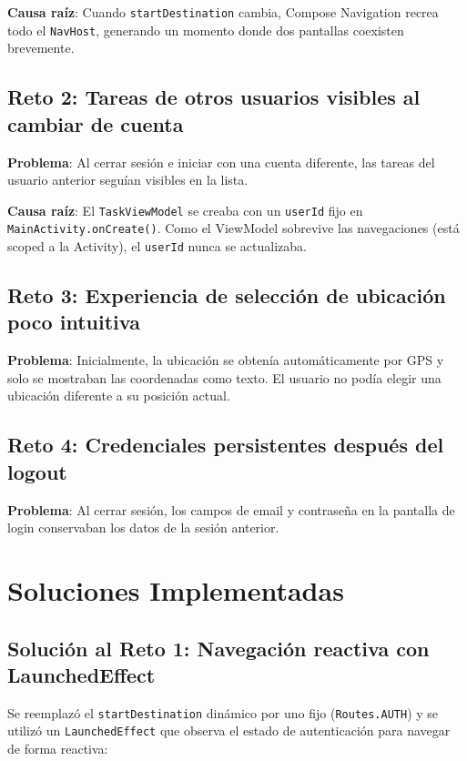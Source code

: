 \documentclass[12pt,a4paper]{article}
\begin{document}
\textbf{Causa raíz}: Cuando \texttt{startDestination} cambia, Compose Navigation recrea todo el \texttt{NavHost}, generando un momento donde dos pantallas coexisten brevemente.

\subsection{Reto 2: Tareas de otros usuarios visibles al cambiar de cuenta}

\textbf{Problema}: Al cerrar sesión e iniciar con una cuenta diferente, las tareas del usuario anterior seguían visibles en la lista.

\textbf{Causa raíz}: El \texttt{TaskViewModel} se creaba con un \texttt{userId} fijo en \texttt{MainActivity.onCreate()}. Como el ViewModel sobrevive las navegaciones (está scoped a la Activity), el \texttt{userId} nunca se actualizaba.

\subsection{Reto 3: Experiencia de selección de ubicación poco intuitiva}

\textbf{Problema}: Inicialmente, la ubicación se obtenía automáticamente por GPS y solo se mostraban las coordenadas como texto. El usuario no podía elegir una ubicación diferente a su posición actual.

\subsection{Reto 4: Credenciales persistentes después del logout}

\textbf{Problema}: Al cerrar sesión, los campos de email y contraseña en la pantalla de login conservaban los datos de la sesión anterior.

\section{Soluciones Implementadas}

\subsection{Solución al Reto 1: Navegación reactiva con LaunchedEffect}

Se reemplazó el \texttt{startDestination} dinámico por uno fijo (\texttt{Routes.AUTH}) y se utilizó un \texttt{LaunchedEffect} que observa el estado de autenticación para navegar de forma reactiva:
\end{document}

